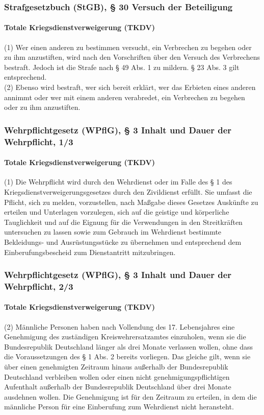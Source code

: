 \documentclass{beamer}
\begin{document}
	\begin{frame}
	  	\frametitle{Strafgesetzbuch (StGB), § 30 Versuch der Beteiligung}
	  	\framesubtitle{Totale Kriegsdienstverweigerung (TKDV)}
		(1) Wer einen anderen zu bestimmen versucht, ein Verbrechen zu begehen oder zu ihm anzustiften, wird nach den Vorschriften über den Versuch des Verbrechens bestraft. Jedoch ist die Strafe nach § 49 Abs. 1 zu mildern. § 23 Abs. 3 gilt entsprechend.\\
		(2) Ebenso wird bestraft, wer sich bereit erklärt, wer das Erbieten eines anderen annimmt oder wer mit einem anderen verabredet, ein Verbrechen zu begehen oder zu ihm anzustiften.
	\end{frame}
	
	\begin{frame}
		\frametitle{Wehrpflichtgesetz (WPflG), § 3 Inhalt und Dauer der Wehrpflicht, 1/3}
		\framesubtitle{Totale Kriegsdienstverweigerung (TKDV)}
		(1) Die Wehrpflicht wird durch den Wehrdienst oder im Falle des § 1 des Kriegsdienstverweigerungsgesetzes durch den Zivildienst erfüllt. Sie umfasst die Pflicht, sich zu melden, vorzustellen, nach Maßgabe dieses Gesetzes Auskünfte zu erteilen und Unterlagen vorzulegen, sich auf die geistige und körperliche Tauglichkeit und auf die Eignung für die Verwendungen in den Streitkräften untersuchen zu lassen sowie zum Gebrauch im Wehrdienst bestimmte Bekleidungs- und Ausrüstungsstücke zu übernehmen und entsprechend dem Einberufungsbescheid zum Dienstantritt mitzubringen.\\
	\end{frame}
	
	\begin{frame}
		\frametitle{Wehrpflichtgesetz (WPflG), § 3 Inhalt und Dauer der Wehrpflicht, 2/3}
		\framesubtitle{Totale Kriegsdienstverweigerung (TKDV)}
		(2) Männliche Personen haben nach Vollendung des 17. Lebensjahres eine Genehmigung des zuständigen Kreiswehrersatzamtes einzuholen, wenn sie die Bundesrepublik Deutschland länger als drei Monate verlassen wollen, ohne dass die Voraussetzungen des § 1 Abs. 2 bereits vorliegen. Das gleiche gilt, wenn sie über einen genehmigten Zeitraum hinaus außerhalb der Bundesrepublik Deutschland verbleiben wollen oder einen nicht genehmigungspflichtigen Aufenthalt außerhalb der Bundesrepublik Deutschland über drei Monate ausdehnen wollen. Die Genehmigung ist für den Zeitraum zu erteilen, in dem die männliche Person für eine Einberufung zum Wehrdienst nicht heransteht.
	\end{frame}
	
\end{document}

